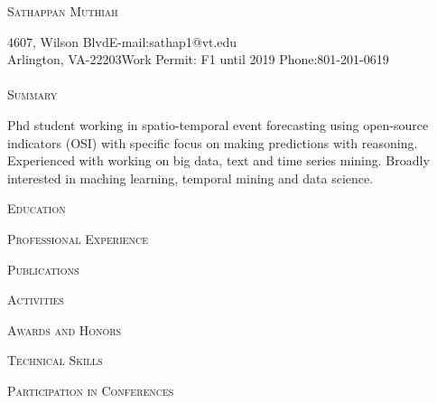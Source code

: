 \documentclass[a4paper]{article}
\newcommand{\lineunder} {\vspace*{-8pt} \\
    \hspace*{-18pt} \hrulefill \\
}
\newcommand{\header} [1] {{\hspace*{-18pt}\vspace*{6pt}\large {\textsc{#1}}}
    \vspace*{-6pt} %
}
\begin{document}

\vspace*{-35pt}

\begin{center}
	{\huge \scshape {Sathappan Muthiah}}\\
\end{center}
\small
4607, Wilson Blvd\hfill E-mail:sathap1@vt.edu\\
Arlington, VA-22203\hfill Work Permit: F1 until 2019 \hfill Phone:801-201-0619 \normalsize \lineunder

%
\header{Summary}

Phd student working in spatio-temporal event forecasting using
open-source indicators (OSI) with specific focus on making predictions with
reasoning. Experienced with working on big data, text and time series mining.
Broadly interested in maching learning, temporal mining and data
science. 

\vspace{1em}
\header{Education}


%

\vspace{1em}
\header{Professional Experience}


\vspace{1em}
\header{Publications}


\vspace{1em}
\header{Activities}


\vspace{1em}
\header{Awards and Honors}


\vspace{1em}
\header{Technical Skills}


\vspace{1em}
\header{Participation in Conferences}

% 
% 
% 
\end{document}
